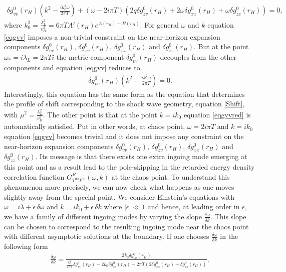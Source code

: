 \documentclass[preprintnumbers,aps,prd,longbibliography,nofootinbib,nobibnotes,amsmath,amssymb]{revtex4}
\begin{document}
	\begin{align}\label{eqgvv}
	\delta g_{v v}^{0}(r_H) \left( k^2 - \frac{i k_{0}^2 \omega}{2 \pi T} \right)+ (\omega -2 i \pi  T) (2 q \delta g_{z v}^{0}(r_H)+2 \omega  \delta g_{x x}^{0}(r_H)+\omega  \delta g_{z z}^{0}(r_H)) = 0,
	\end{align} 
	where $k_{0}^{2} = \frac{\lambda_{L}^2}{v_B^2} = 6 \pi T A'(r_H) e^{A(r_H)-B(r_H)}$. For general $\omega$ and $k$  equation \eqref{eqgvv} imposes a non-trivial constraint on the  near-horizon expansion  components $\delta g_{v v}^{0}(r_H)$, $\delta g_{z v}^{0}(r_H)$, $\delta g_{x x}^{0}(r_H)$ and $\delta g_{z z}^{0}(r_H)$. But  at the point  $\omega_{*}=i\lambda_{L}=2 \pi Ti$ the metric component $\delta g_{v v}^{0}(r_H)$ decouples from the other components and equation \eqref{eqgvv}  reduces to
\begin{align}\label{eqgvvred}
	\delta g_{v v}^{0}(r_H) \left( k^2 - \frac{i k_{0}^2 \omega}{2 \pi T} \right) = 0.
\end{align} 
Interestingly,  this equation has the same form as the equation that determines the profile of shift corresponding to  the  shock wave geometry, equation \eqref{Shift}, with  $\mu^{2}=\frac{\lambda_{L}^2 }{v_B^2}$. The other point is that at the point $k=i k_{0}$  equation \eqref{eqgvvred}  is automatically satisfied. Put in other words,  at chaos point, $\omega = 2 i \pi T$ and $k = i k_0$ equation \eqref{eqgvv} becomes trivial and it does not impose any constraint on the near-horizon expansion components  $\delta g^{0}_{v v}(r_H)$, $\delta g^{0}_{z v}(r_H)$, $\delta g^{0}_{x x}(r_H)$ and $\delta g^{0}_{z z}(r_H)$. Its message is that there exists one extra ingoing mode emerging at this point and as a result lead to the pole-skipping in  the retarded energy density correlation function $G^{R}_{T^{00}T^{00}}(\omega,k)$  at the chaos point. To understand this phenomenon more precisely, we  can now check what happens as one moves slightly away from the special point. We consider Einstein’s equations with $\omega=i\lambda+\epsilon\,\delta\omega$ and $k=i k_{0} + \epsilon\, \delta k$ where $\vert \epsilon \vert\ll 1$ and hence, at leading order in $\epsilon$,  we have a  family  of different ingoing modes by varying the slope $\frac{\delta \omega}{\delta k}$. This slope can be chosen to correspond to the resulting ingoing mode near the chaos point with different asymptotic solutions at the boundary. If one chooses $\frac{\delta \omega}{\delta k}$ in the following form 
	\begin{align}\label{eqslope}
	\frac{\delta \omega}{\delta k} = \frac{2 k_{0} \delta g^{0}_{v v}(r_H)}{\frac{k_{0}^2}{2 \pi T}\delta g^{0}_{v v}(r_H) - 2 k_{0} \delta g^{0}_{z v}(r_H) - 2 \pi  T \left(2\delta g^{0}_{x x}(r_H) + \delta g^{0}_{z z}(r_H)\right)},
	\end{align}
\end{document}
